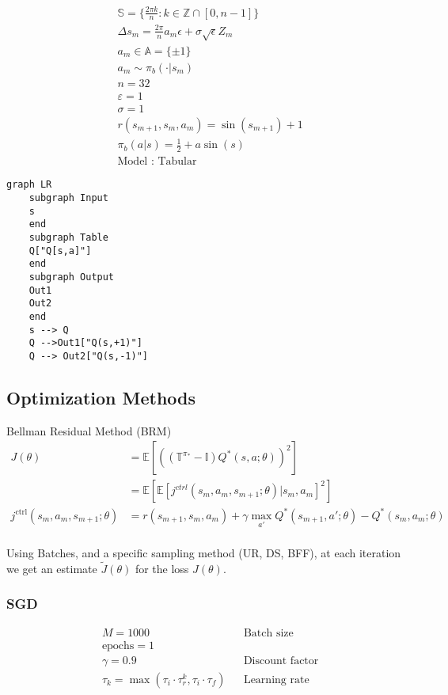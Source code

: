 \[
\begin{aligned}
&\mathbb S = \{\tfrac{2\pi k }{n}: k\in \mathbb Z \cap [0,n-1]\}\\
&\Delta s_{m} = \tfrac{2\pi}{n}a_m\epsilon + \sigma \sqrt{\epsilon} Z_m\\
&a_m \in\mathbb A = \{\pm 1\}\\
&a_m\sim \pi_b(\cdot|s_m)\\
& n=32\\
&\varepsilon = 1\\
&\sigma = 1\\
&r(s_{m+1},s_{m},a_m) = \sin(s_{m+1})+1\\
&\pi_b(a|s)=\tfrac{1}{2}+ a\sin(s)\\
&\text{Model : Tabular}
\end{aligned}
\]

\begin{verbatim}
graph LR
    subgraph Input
    s 
    end
    subgraph Table
    Q["Q[s,a]"]
    end
    subgraph Output
    Out1
    Out2
    end
    s --> Q
    Q -->Out1["Q(s,+1)"]
    Q --> Out2["Q(s,-1)"]
\end{verbatim}

\hypertarget{optimization-methods}{%
\subsection{Optimization Methods}\label{optimization-methods}}

Bellman Residual Method (BRM) \[
\begin{aligned}
J(\theta) &= \mathbb E[((\mathbb T^{\pi_*}-\mathbb I) Q^*(s,a;\theta))^2]\\
&= \mathbb E[\mathbb E[j^{ctrl}(s_m, a_m, s_{m+1};\theta)|s_m,a_m]^2]\\
j^{\text{ctrl}}(s_m, a_m, s_{m+1};\theta) &= r(s_{m+1}, s_m, a_m)  + \gamma \max_{a'} Q^*(s_{m+1},a';\theta) - Q^*(s_m,a_m;\theta)\\
\end{aligned}
\]

Using Batches, and a specific sampling method (UR, DS, BFF), at each
iteration we get an estimate \(\tilde J(\theta)\) for the loss
\(J(\theta)\).

\hypertarget{sgd}{%
\subsubsection{SGD}\label{sgd}}

\[
\begin{aligned}
&M = 1000 && \text{Batch size}\\
&\text{epochs} = 1\\
&γ = 0.9 && \text{Discount factor}\\
&τ_k = \max(\tau_i\cdot \tau_r^k, \tau_i\cdot\tau_f) && \text{Learning rate}
\end{aligned}
\]

